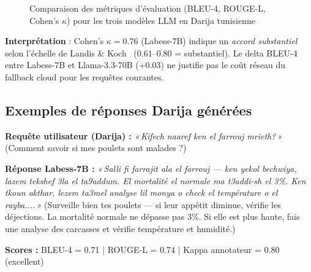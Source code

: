 \begin{figure}[H]
\centering
{}
\caption{Comparaison des métriques d'évaluation (BLEU-4, ROUGE-L, Cohen's $\kappa$) pour les trois modèles LLM en Darija tunisienne}
\label{fig:darija_metrics}
\end{figure}

\textbf{Interprétation} : Cohen's $\kappa = 0.76$ (Labess-7B) indique un
\textit{accord substantiel} selon l'échelle de Landis \& Koch~\cite{landis1977}
($0.61$--$0.80$ = substantiel). Le delta BLEU-4 entre Labess-7B et
Llama-3.3-70B (+0.03) ne justifie pas le coût réseau du fallback cloud pour
les requêtes courantes.

\subsection{Exemples de réponses Darija générées}

\begin{tcolorbox}[
  colback=green!6, colframe=green!50!black,
  title={\textbf{Exemple 1 — Consultation mortalité avicole}},
  fonttitle=\small\bfseries, boxrule=0.8pt
]
\textbf{Requête utilisateur (Darija) :} \textit{«\,Kifech naaref ken el farrouj mrieth?\,»}
(Comment savoir si mes poulets sont malades ?)

\textbf{Réponse Labess-7B :} \textit{«\,Salli fi farrajit ala el farrouj — ken yekol bechwiya, lazem tekshef 3la el ta9addum. El mortalité el normale ma t3addi-sh el 3\%. Ken tkoun akthar, lezem ta3mel analyse lil monya o check el température o el rayba....\,»}
(Surveille bien tes poulets — si leur appétit diminue, vérifie les déjections. La mortalité normale ne dépasse pas 3\%. Si elle est plus haute, fais une analyse des carcasses et vérifie température et humidité.)

\textbf{Scores :} BLEU-4 = 0.71 | ROUGE-L = 0.74 | Kappa annotateur = 0.80 (excellent)
\end{tcolorbox}

